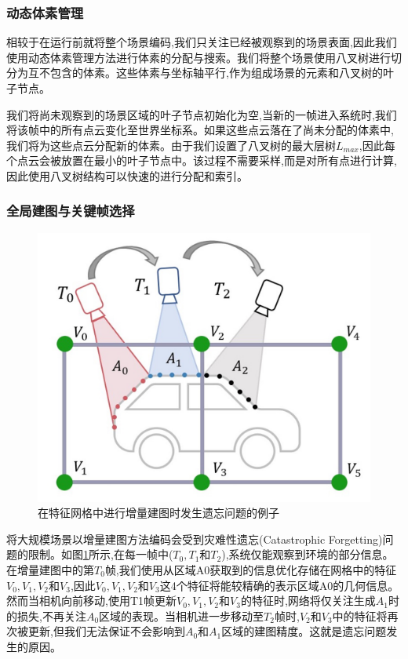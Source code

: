 \subsubsection{动态体素管理}
相较于在运行前就将整个场景编码,我们只关注已经被观察到的场景表面,因此我们使用动态体素管理方法进行体素的分配与搜索。我们将整个场景使用八叉树进行切分为互不包含的体素。这些体素与坐标轴平行,作为组成场景的元素和八叉树的叶子节点。

我们将尚未观察到的场景区域的叶子节点初始化为空,当新的一帧进入系统时,我们将该帧中的所有点云变化至世界坐标系。如果这些点云落在了尚未分配的体素中,我们将为这些点云分配新的体素。由于我们设置了八叉树的最大层树$L_{max}$,因此每个点云会被放置在最小的叶子节点中。该过程不需要采样,而是对所有点进行计算,因此使用八叉树结构可以快速的进行分配和索引。
\subsubsection{全局建图与关键帧选择}
\begin{figure}[htbp]
    \includegraphics[scale = 0.2]{figures/forgetting.jpg}
    \centering
    \caption{在特征网格中进行增量建图时发生遗忘问题的例子} \label{forgetting}
\end{figure}
将大规模场景以增量建图方法编码会受到灾难性遗忘(Catastrophic Forgetting)问题的限制。如图\ref{forgetting}所示,在每一帧中($T_0, T_1$和$T_2$),系统仅能观察到环境的部分信息。在增量建图中的第$T_0$帧,我们使用从区域A0获取到的信息优化存储在网格中的特征$V_0, V_1, V_2$和$V_3$,因此$V_0, V_1, V_2$和$V_3$这4个特征将能较精确的表示区域A0的几何信息。然而当相机向前移动,使用T1帧更新$V_0, V_1, V_2$和$V_3$的特征时,网络将仅关注生成$A_1$时的损失,不再关注$A_0$区域的表现。当相机进一步移动至$T_2$帧时,$V_2$和$V_3$中的特征将再次被更新,但我们无法保证不会影响到$A_0$和$A_1$区域的建图精度。这就是遗忘问题发生的原因。

